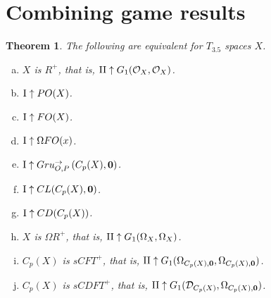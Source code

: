 \documentclass[11pt]{article}
\theoremstyle{plain}
\newtheorem{theorem}{Theorem}
\theoremstyle{definition}
\theoremstyle{remark}
\theoremstyle{plain}
\theoremstyle{definition}
\theoremstyle{remark}
\begin{document}
\section{Combining game results}

\begin{theorem}
The following are equivalent for \(T_{3.5}\) spaces \(X\).
\begin{enumerate}[a)]
\item \(X\) is \(R^+\), that is, \(\mathrm{II}\uparrow G_{1}(\mathcal{O}_X,\mathcal{O}_X)\).
\item \(\mathrm{I}\uparrow PO(X)\). 
\item \(\mathrm{I}\uparrow FO(X)\).
\item \(\mathrm{I}\uparrow\Omega FO(x)\).
\item \(\mathrm{I}\uparrow Gru_{O,P}^{\to}\left({C_p(X)},{\mathbf 0}\right)\).
\item \(\mathrm{I}\uparrow CL(C_p(X),\mathbf 0)\).
\item \(\mathrm{I}\uparrow CD(C_p(X))\).
\item \(X\) is \(\Omega R^+\), that is, 
  \(\mathrm{II}\uparrow G_{1}(\Omega_X,\Omega_X)\).
\item \(C_p(X)\) is \(sCFT^+\), that is, 
  \(\mathrm{II}\uparrow G_{1}(\Omega_{C_p(X),\mathbf 0},\Omega_{C_p(X),\mathbf 0})\).
\item \(C_p(X)\) is \(sCDFT^+\), that is,
  \(\mathrm{II}\uparrow G_{1}(\mathcal{D}_{C_p(X)},\Omega_{C_p(X),\mathbf 0})\).
\end{enumerate}
\end{theorem}
\end{document}
